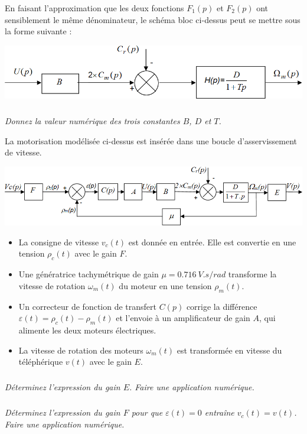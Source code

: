 \documentclass[10pt,fleqn]{article} %
\begin{document}
En faisant l’approximation que les deux fonctions $F_1(p)$ et $F_2(p)$ ont sensiblement le même dénominateur, le schéma bloc ci-dessus peut se mettre sous la forme suivante :
\begin{center}
	\includegraphics[width=\linewidth]{images2/fig_03}
\end{center}


\subparagraph{}
\textit{Donnez la valeur numérique des trois constantes $B$, $D$ et $T$.}

La motorisation modélisée ci-dessus est insérée dans une boucle d’asservissement de vitesse.

\begin{center}
	\includegraphics[width=\linewidth]{images2/fig_04}
\end{center}

\begin{itemize}
\item La consigne de vitesse $v_c(t)$ est donnée en entrée. Elle est convertie en une tension $\rho_c(t)$ avec le gain $F$.
\item Une génératrice tachymétrique de gain $\mu=\SI{0.716}{V.s/rad}$ transforme la vitesse de rotation $\omega_m(t)$ du moteur en une tension $\rho_m(t)$.
\item Un correcteur de fonction de transfert $C(p)$ corrige la différence $\varepsilon(t)=\rho_c(t)- \rho_m(t)$ et l’envoie à un amplificateur de gain $A$, qui alimente les deux moteurs électriques.
\item La vitesse de rotation des moteurs $\omega_m(t)$ est transformée en vitesse du téléphérique $v(t)$ avec le gain $E$.
\end{itemize}

\subparagraph{}
\textit{Déterminez l’expression du gain $E$. Faire une application numérique.}

\subparagraph{}
\textit{Déterminez l’expression du gain $F$ pour que $\varepsilon(t)=0$ entraîne $v_c(t)=v(t)$. Faire une application numérique.}
\end{document}
